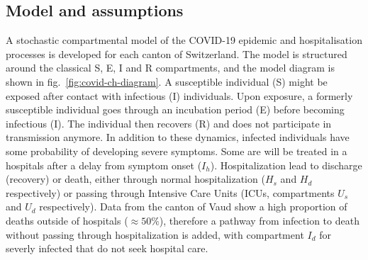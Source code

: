 \subsection{Model and assumptions}
A stochastic compartmental model of the COVID-19 epidemic and hospitalisation processes is developed for each canton of Switzerland. The model is structured around the classical S, E, I and R compartments\cite{Kermack:ContributionMathematicalTheory:1927}, and the model diagram is shown in fig.~\ref{fig:covid-ch-diagram}. %
A susceptible individual (S) might be exposed after contact with infectious (I) individuals. Upon exposure, a formerly susceptible individual goes through an incubation period (E) before becoming infectious (I). The individual then recovers (R) and does not participate in transmission anymore. 
In addition to these dynamics, infected individuals have some probability of developing severe symptoms. Some are will be treated in a hospitals after a delay from symptom onset ($I_h$). Hospitalization lead to discharge (recovery) or death, either through normal hospitalization ($H_{s}$ and $H_d$ respectively) or passing through Intensive Care Units (ICUs, compartments $U_{s}$ and $U_d$ respectively). Data from the canton of Vaud show a high proportion of deaths outside of hospitals ($\approx 50\%$), therefore a pathway from infection to death without passing through hospitalization is added, with compartment $I_d$ for severly infected that do not seek hospital care. 

